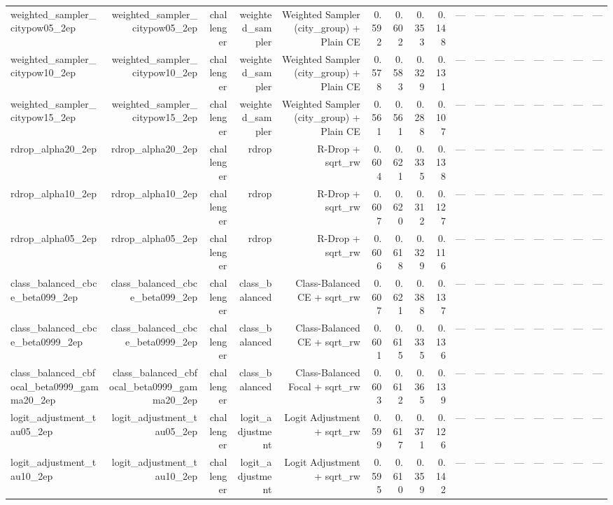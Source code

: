 \begin{tabular}{lrrrrrrrrrrrrrrrr}
weighted\_sampler\_citypow05\_2ep & weighted\_sampler\_citypow05\_2ep & challenger & weighted\_sampler & Weighted Sampler (city\_group) + Plain CE & 0.592 & 0.602 & 0.353 & 0.148 & --- & --- & --- & --- & --- & --- & --- & --- \\
weighted\_sampler\_citypow10\_2ep & weighted\_sampler\_citypow10\_2ep & challenger & weighted\_sampler & Weighted Sampler (city\_group) + Plain CE & 0.578 & 0.583 & 0.329 & 0.131 & --- & --- & --- & --- & --- & --- & --- & --- \\
weighted\_sampler\_citypow15\_2ep & weighted\_sampler\_citypow15\_2ep & challenger & weighted\_sampler & Weighted Sampler (city\_group) + Plain CE & 0.561 & 0.561 & 0.288 & 0.107 & --- & --- & --- & --- & --- & --- & --- & --- \\
rdrop\_alpha20\_2ep & rdrop\_alpha20\_2ep & challenger & rdrop & R-Drop + sqrt\_rw & 0.604 & 0.621 & 0.335 & 0.138 & --- & --- & --- & --- & --- & --- & --- & --- \\
rdrop\_alpha10\_2ep & rdrop\_alpha10\_2ep & challenger & rdrop & R-Drop + sqrt\_rw & 0.607 & 0.620 & 0.312 & 0.127 & --- & --- & --- & --- & --- & --- & --- & --- \\
rdrop\_alpha05\_2ep & rdrop\_alpha05\_2ep & challenger & rdrop & R-Drop + sqrt\_rw & 0.606 & 0.618 & 0.329 & 0.116 & --- & --- & --- & --- & --- & --- & --- & --- \\
class\_balanced\_cbce\_beta099\_2ep & class\_balanced\_cbce\_beta099\_2ep & challenger & class\_balanced & Class-Balanced CE + sqrt\_rw & 0.607 & 0.621 & 0.388 & 0.137 & --- & --- & --- & --- & --- & --- & --- & --- \\
class\_balanced\_cbce\_beta0999\_2ep & class\_balanced\_cbce\_beta0999\_2ep & challenger & class\_balanced & Class-Balanced CE + sqrt\_rw & 0.601 & 0.615 & 0.335 & 0.136 & --- & --- & --- & --- & --- & --- & --- & --- \\
class\_balanced\_cbfocal\_beta0999\_gamma20\_2ep & class\_balanced\_cbfocal\_beta0999\_gamma20\_2ep & challenger & class\_balanced & Class-Balanced Focal + sqrt\_rw & 0.603 & 0.612 & 0.365 & 0.139 & --- & --- & --- & --- & --- & --- & --- & --- \\
logit\_adjustment\_tau05\_2ep & logit\_adjustment\_tau05\_2ep & challenger & logit\_adjustment & Logit Adjustment + sqrt\_rw & 0.599 & 0.617 & 0.371 & 0.126 & --- & --- & --- & --- & --- & --- & --- & --- \\
logit\_adjustment\_tau10\_2ep & logit\_adjustment\_tau10\_2ep & challenger & logit\_adjustment & Logit Adjustment + sqrt\_rw & 0.595 & 0.610 & 0.359 & 0.142 & --- & --- & --- & --- & --- & --- & --- & --- \\

\end{tabular}
